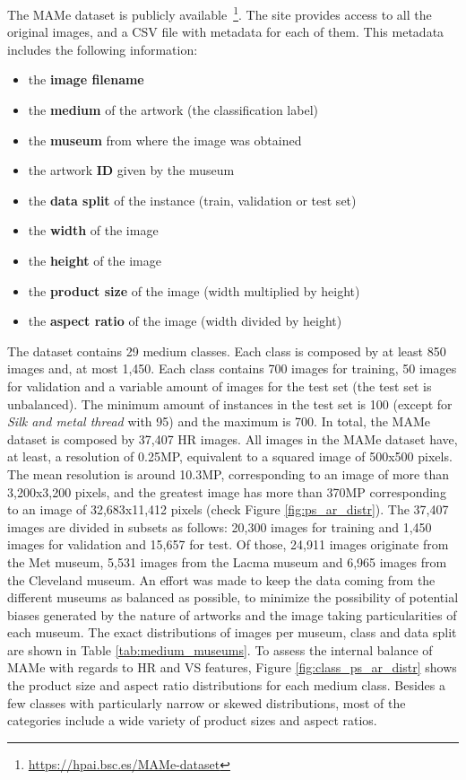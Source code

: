 \documentclass{article}
\begin{document}
The MAMe dataset is publicly available~\footnote{\label{note1}\url{https://hpai.bsc.es/MAMe-dataset}}. The site provides access to all the original images, and a CSV file with metadata for each of them. This metadata includes the following information:
\begin{itemize}
    \item the \textbf{image filename}
    \item the \textbf{medium} of the artwork (\ie the classification label)
    \item the \textbf{museum} from where the image was obtained
    \item the artwork \textbf{ID} given by the museum
    \item the \textbf{data split} of the instance (\ie train, validation or test set)
    \item the \textbf{width} of the image
    \item the \textbf{height} of the image
    \item the \textbf{product size} of the image (\ie width multiplied by height)
    \item the \textbf{aspect ratio} of the image (\ie width divided by height)
\end{itemize}

The dataset contains 29 medium classes. Each class is composed by at least 850 images and, at most 1,450. Each class contains 700 images for training, 50 images for validation and a variable amount of images for the test set (\ie the test set is unbalanced). The minimum amount of instances in the test set is 100 (except for \textit{Silk and metal thread} with 95) and the maximum is 700.
In total, the MAMe dataset is composed by 37,407 HR images. All images in the MAMe dataset have, at least, a resolution of 0.25MP, equivalent to a squared image of 500x500 pixels. The mean resolution is around 10.3MP, corresponding to an image of more than 3,200x3,200 pixels, and the greatest image has more than 370MP corresponding to an image of 32,683x11,412 pixels (check Figure \ref{fig:ps_ar_distr}). The 37,407 images are divided in subsets as follows: 20,300 images for training and 1,450 images for validation and 15,657 for test. Of those, 24,911 images originate from the Met museum, 5,531 images from the Lacma museum and 6,965 images from the Cleveland museum. An effort was made to keep the data coming from the different museums as balanced as possible, to minimize the possibility of potential biases generated by the nature of artworks and the image taking particularities of each museum. The exact distributions of images per museum, class and data split are shown in Table \ref{tab:medium_museums}. To assess the internal balance of MAMe with regards to HR and VS features, Figure \ref{fig:class_ps_ar_distr} shows the product size and aspect ratio distributions for each medium class. Besides a few classes with particularly narrow or skewed distributions, most of the categories include a wide variety of product sizes and aspect ratios.
\end{document}
